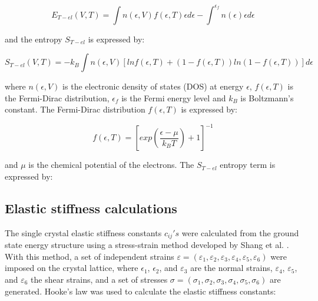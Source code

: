\begin{equation}
\label{eq:etel}
E_{T-el} (V,T) = \int n\left(\epsilon, V\right) f \left(\epsilon, T\right) \epsilon d \epsilon - \int^{\epsilon_{f}} n (\epsilon) \epsilon d \epsilon
\end{equation}

\noindent and the entropy $S_{T-el}$ is expressed by:

\begin{equation}
\label{eq:sel}
S_{T-el} (V,T) = -k_{B} \int n(\epsilon, V) \left[ ln f \left(\epsilon,T\right) + \left( 1 - f(\epsilon, T) \right) ln \left( 1 - f \left(\epsilon, T \right) \right) \right] d\epsilon 
\end{equation}

\noindent where $n(\epsilon, V)$ is the electronic density of states (DOS) at energy $\epsilon$,  $f (\epsilon,T)$ is the Fermi-Dirac distribution, $\epsilon_{f}$ is the Fermi energy level and $k_{B}$ is Boltzmann's constant. The Fermi-Dirac distribution $f (\epsilon, T)$ is expressed by:

\begin{equation}
\label{eq:fermidirac}
f (\epsilon,T) = \left[ exp \left( \frac{\epsilon - \mu}{k_{B} T} \right) + 1 \right]^{-1}
\end{equation}

and $\mu$ is the chemical potential of the electrons. The $S_{T-el}$ entropy term is expressed by:



\subsection{Elastic stiffness calculations}

The single crystal elastic stiffness constants $c_{ij}'s$ were calculated from the ground state energy structure using a stress-strain method developed by Shang et al. \cite{Shang2007c}. With this method, a set of independent strains $\varepsilon = (\varepsilon_{1}, \varepsilon_{2}, \varepsilon_{3}, \varepsilon_{4}, \varepsilon_{5}, \varepsilon_{6})$  were imposed on the crystal lattice, where $\epsilon_{1}$, $\epsilon_{2}$, and $\varepsilon_{3}$ are the normal strains, $\varepsilon_{4}$, $\varepsilon_{5}$, and $\varepsilon_{6}$ the shear strains, and a set of stresses $\sigma = (\sigma_{1}, \sigma_{2}, \sigma_{3}, \sigma_{4}, \sigma_{5},\sigma_{6})$ are generated. Hooke's law was used to calculate the elastic stiffness constants: 


